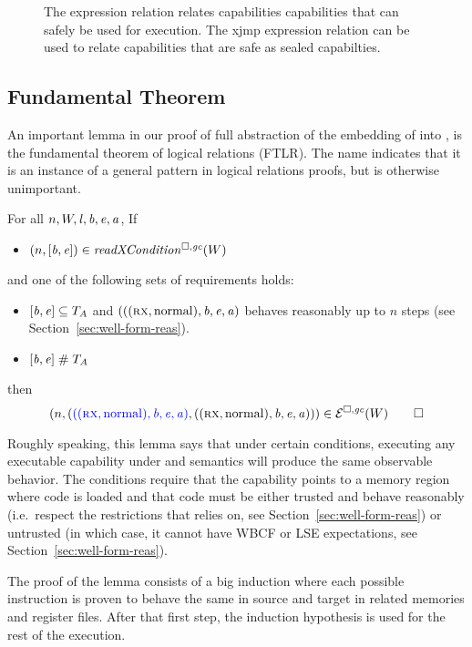 \begin{jversion}
\begin{figure}
\caption{The expression relation relates capabilities capabilities that can safely be used for execution. The xjmp expression relation can be used to relate capabilities that are safe as sealed capabilties.}
\label{fig:expr-rels}
\end{figure}

\subsection{Fundamental Theorem}
An important lemma in our proof of full abstraction of the embedding of \srccm{} into \trgcm{}, is the fundamental theorem of logical relations (FTLR).
The name indicates that it is an instance of a general pattern in logical relations proofs, but is otherwise unimportant.
\begin{theorem}[FTLR]
  \label{thm:ftlr}
  For all $n,W,\mathit{l},\mathit{b},\mathit{e},\mathit{a}$,
  If
  \begin{itemize}
  \item $\npair{[\baddr,\eaddr]} \in \xReadCond{W}$
  \end{itemize}
  and one of the following sets of requirements holds:
  \begin{itemize}
  \item $[\mathit{b},\mathit{e}] \subseteq T_{A}$ and
 $({((\textsc{rx},\mathrm{normal}),\mathit{b},\mathit{e},\mathit{a})}$ behaves reasonably up to $n$ steps (see Section~\ref{sec:well-form-reas}).
  \item $[\mathit{b},\mathit{e}] \mathrel{\#} T_{A}$
  \end{itemize}
  then
  \[
    \left(n,\left({\color{blue} ((\textsc{rx},\mathrm{normal}),\mathit{b},\mathit{e},\mathit{a})}, ((\textsc{rx},\mathrm{normal}),\mathit{b},\mathit{e},\mathit{a})\right)\right) \in \mathcal{E}^{\square,\mathit{gc}}(W) \qedhere
  \]
\end{theorem}
Roughly speaking, this lemma says that under certain conditions, executing any executable capability under \srccm{} and \trgcm{} semantics will produce the same observable behavior.
The conditions require that the capability points to a memory region where code is loaded and that code must be either trusted and behave reasonably (i.e.\ respect the restrictions that \stktokens{} relies on, see Section~\ref{sec:well-form-reas}) or untrusted (in which case, it cannot have WBCF or LSE expectations, see Section~\ref{sec:well-form-reas}).

The proof of the lemma consists of a big induction where each possible instruction is proven to behave the same in source and target in related memories and register files.
After that first step, the induction hypothesis is used for the rest of the execution.


\end{jversion}
